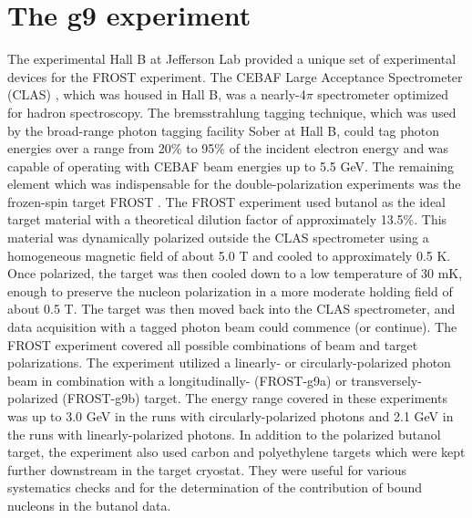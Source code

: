 \section{The g9 experiment}
The experimental Hall B at Jefferson Lab provided a unique set of experimental devices for the FROST experiment. The CEBAF Large Acceptance Spectrometer (CLAS)\cite{CLAS} , which was housed in Hall B, was a nearly-4$\pi$ spectrometer optimized for hadron spectroscopy. The bremsstrahlung tagging technique, which was used by the broad-range photon tagging facility Sober\cite{Sober_2000} at Hall B, could tag photon energies over a range from 20\% to 95\% of the incident electron energy and was capable of operating with CEBAF beam energies up to 5.5 GeV. The remaining element which was indispensable for the double-polarization experiments was the frozen-spin target FROST \cite{Keith_2012}. The FROST experiment used butanol as the ideal target material with a theoretical dilution factor of approximately 13.5\%. This material was dynamically polarized outside the CLAS spectrometer using a homogeneous magnetic field of about 5.0 T and cooled to approximately 0.5 K. Once polarized, the target was then cooled down to a low temperature of 30 mK, enough to preserve the nucleon polarization in a more moderate holding field of about 0.5 T. The target was then moved back into the CLAS spectrometer, and data acquisition with a tagged photon beam could commence (or continue). The FROST experiment covered all possible combinations of beam and target polarizations. The experiment utilized a linearly- or circularly-polarized photon beam in combination with a longitudinally- (FROST-g9a) or transversely-polarized (FROST-g9b) target. The energy range covered in these experiments was up to 3.0 GeV in the runs with circularly-polarized photons and 2.1 GeV in the runs with linearly-polarized photons. In addition to the polarized butanol target, the experiment also used carbon and polyethylene targets which were kept further downstream in the target cryostat. They were useful for various systematics checks and for the determination of the contribution of bound nucleons in the butanol data.
